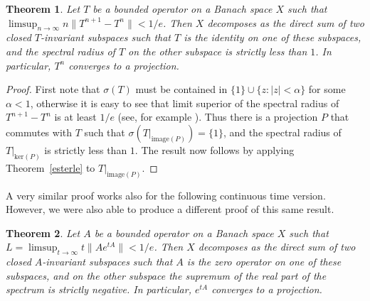 \documentclass[12pt]{amsart}
\newtheorem{thm}{Theorem}[section]
\newcommand{\modo}[1]{{\left|#1\right|}}
\newcommand{\snormo}[1]{{\mathopen\|#1\mathclose\|}}
\begin{document}
\begin{thm}
\label{T^n}
Let $T$ be a bounded operator on a Banach space $X$ such that
$\limsup_{n\to\infty} n \snormo{T^{n+1}-T^n} < 1/e $.
Then $X$ decomposes as the direct sum of two closed $T$-invariant
subspaces such that $T$ is the identity on one of these subspaces, and
the spectral radius of $T$ on the other subspace is strictly less
than $1$.  In particular, $T^n$ converges to a projection.
\end{thm}

\begin{proof}
First note that $\sigma(T)$
must be contained in $\{1\} \cup \{z:\modo z < \alpha\}$
for some $\alpha<1$, otherwise it is easy to see that
limit superior of the spectral radius
of $T^{n+1}-T^n$ is at least $1/e$  (see, for example
\cite[Theorem 4.5.1]{navanlinna1}).
Thus there is a projection $P$ that commutes with $T$ such that
$\sigma(T|_{\text{image}(P)}) = \{1\}$, and
the spectral radius of $T|_{\text{ker}(P)}$ is strictly less than $1$.
The result now follows by applying Theorem~\ref{esterle} to
$T|_{\text{image}(P)}$.
\end{proof}

A very similar proof works also for the following continuous time version.
However, we were also able to produce a different proof of this same result.

\begin{thm}
\label{exp tA}
Let $A$ be a bounded operator on a Banach
space $X$ such that
$ L = \limsup_{t\to\infty} t \snormo{A e^{tA}} < 1/e $.
Then $X$ decomposes as the direct sum of two closed $A$-invariant
subspaces such that $A$ is the zero operator on one of these subspaces, and
on the other subspace the supremum of the real part of the spectrum is
strictly negative.
In particular, $e^{tA}$ converges to a projection.
\end{thm}
\end{document}
